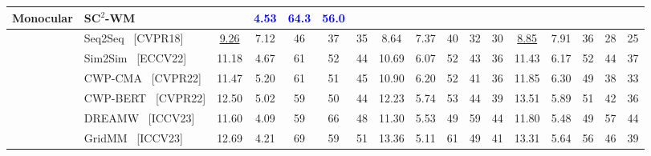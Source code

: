 \documentclass{article}
\theoremstyle{plain}
\theoremstyle{definition}
\theoremstyle{remark}
\begin{document}
\begin{table}[thpb]
{\begin{threeparttable}
\begin{tabular}{@{}c|l|ccccccccccccccc@{}}
   		\multicolumn{1}{c|}{\multirow{-14}{*}{\textbf{Monocular}}} & \cellcolor{gray!15}\textbf{SC$^2$-WM} & \multicolumn{1}{c}{\cellcolor{gray!15}{\textcolor{blue}{17.26}}} &  \multicolumn{1}{c}{\cellcolor{gray!15}\textcolor{blue}{4.53}} &  \multicolumn{1}{c}{\cellcolor{gray!15}\textcolor{blue}{64.3}} &  \multicolumn{1}{c}{\cellcolor{gray!15}\textcolor{blue}{56.0}} &  \multicolumn{1}{c|}{\cellcolor{gray!15}{\textcolor{blue}{41.9}}} & \multicolumn{1}{c}{\cellcolor{gray!15}{\textcolor{blue}{17.65}}} & \multicolumn{1}{c}{\cellcolor{gray!15}{\textcolor{blue}{5.37}}} & \multicolumn{1}{c}{\cellcolor{gray!15}{\textcolor{blue}{58.8}}} & \multicolumn{1}{c}{\cellcolor{gray!15}{\textcolor{blue}{50.9}}} & \multicolumn{1}{c|}{\cellcolor{gray!15}{\textcolor{blue}{37.2}}} & {\cellcolor{gray!15}{\textcolor{blue}{21.68}}} & \multicolumn{1}{c}{\cellcolor{gray!15}{\textcolor{blue}{6.04}}} & \multicolumn{1}{c}{\cellcolor{gray!15}{\textcolor{blue}{57.1}}} & \multicolumn{1}{c}{\cellcolor{gray!15}{\textcolor{blue}{47.0}}} & {\cellcolor{gray!15}{\textcolor{blue}{32.1}}}  \\
            \midrule[0.7pt]
			\multicolumn{1}{c|}{} 
			& Seq2Seq~\cite{anderson2018vision} {\scriptsize {\color{Gray} [CVPR18]} } & \underline{9.26} & 7.12 & 46 & 37 & \multicolumn{1}{c|}{35} & 8.64 & 7.37 & 40 & 32 & \multicolumn{1}{c|}{30} & \underline {8.85} & 7.91 & 36 & 28 & 25 \\
			& Sim2Sim~\cite{Krantz2022Sim2SimTF} {\scriptsize {\color{Gray} [ECCV22]} }& 11.18 & 4.67 & 61 & 52 & \multicolumn{1}{c|}{44} & 10.69 & 6.07 & 52 & 43 & \multicolumn{1}{c|}{36} & 11.43 & 6.17 & 52 & 44 & 37 \\
			& CWP-CMA~\cite{Hong2022BridgingTG} {\scriptsize {\color{Gray} [CVPR22]}}& 11.47 & 5.20 & 61 & 51 & \multicolumn{1}{c|}{45} & 10.90 & 6.20 & 52 & 41 & \multicolumn{1}{c|}{36} & 11.85 & 6.30 & 49 & 38 & 33 \\
			& CWP-BERT~\cite{Hong2022BridgingTG}{\scriptsize {\color{Gray} [CVPR22]}}& 12.50 & 5.02 & 59 & 50 & \multicolumn{1}{c|}{44} & 12.23 & 5.74 & 53 & 44 & \multicolumn{1}{c|}{39} & 13.51 & 5.89 & 51 & 42 & 36 \\
			& DREAMW~\cite{Wang2023DREAMWALKERMP} {\scriptsize {\color{Gray} [ICCV23]}}& 11.60 & 4.09 & 59 & 66 & \multicolumn{1}{c|}{48} & 11.30 & 5.53 & 49 & {59} & \multicolumn{1}{c|}{44} & 11.80 & 5.48 & 49 & {57} & 44 \\
			& GridMM~\cite{wang2023gridmm} {\scriptsize {\color{Gray} [ICCV23]}}& 12.69 & 4.21 & 69 & 59 & \multicolumn{1}{c|}{51} & 13.36 & 5.11 & 61 & 49 & \multicolumn{1}{c|}{41} & 13.31 & 5.64 & 56 & 46 & 39 \\

\end{tabular}
\end{threeparttable}}
\end{table}
\end{document}
